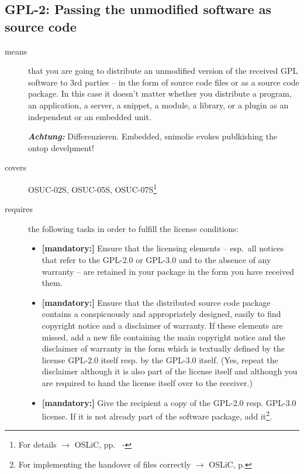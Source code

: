 \subsection{GPL-2: Passing the unmodified software as source code}
\label{OSUC-02S-GPL} \label{OSUC-05S-GPL} \label{OSUC-07S-GPL} 

\begin{description}

\item[means] that you are going to distribute an unmodified version of the
received GPL software to 3rd parties -- in the form of source code files or as a
source code package. In this case it doesn't matter whether you 
distribute a program, an application, a server, a snippet, a module, a library,
or a plugin as an independent or an embedded unit.

\textbf{\emph{Achtung:}} Differenzieren. Embedded, snimolie evokes publkishing the ontop develpment!

\item[covers] OSUC-02S, OSUC-05S, OSUC-07S\footnote{For details $\rightarrow$
OSLiC, pp.\ \pageref{OSUC-02S-DEF} - \pageref{OSUC-07S-DEF}}

\item[requires] the following tasks in order to fulfill the license conditions:
\begin{itemize}
 
  \item \textbf{[mandatory:]} Ensure that the licensing elements -- esp.\ all
  notices that refer to the GPL-2.0 or GPL-3.0 and to the absence of any
  warranty -- are retained in your package in the form you have received them.

  \item \textbf{[mandatory:]} Ensure that the distributed source code package
  contains a conspicuously and appropriately designed, easily to find copyright
  notice and a disclaimer of warranty. If these elements are missed, add a new
  file containing the main copyright notice and the disclaimer of warranty in the
  form which is textually defined by the license GPL-2.0 itself resp. by the
  GPL-3.0 itself. (Yes, repeat the disclaimer although it is also part of the
  license itself and although you are required to hand the license itself over
  to the receiver.)
  
  \item \textbf{[mandatory:]} Give the recipient a copy of the GPL-2.0 resp.
  GPL-3.0 license. If it is not already part of the software package, add
  it\footnote{For implementing the handover of files correctly $\rightarrow$
  OSLiC, p. \pageref{DistributingFilesHint}}.


\end{itemize}
\end{description}
